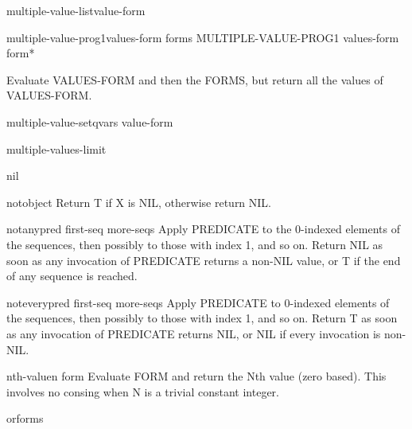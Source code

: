\begin{macro}{multiple-value-list}{value-form}{}
  
\end{macro}

\begin{specialop}{multiple-value-prog1}{values-form \rest forms}{}
  MULTIPLE-VALUE-PROG1 values-form form*

Evaluate VALUES-FORM and then the FORMS, but return all the values of
VALUES-FORM.
\end{specialop}

\begin{macro}{multiple-value-setq}{vars value-form}{}
  
\end{macro}

\begin{constant}{multiple-values-limit}{}{}
  
\end{constant}

\begin{constant}{nil}{}{}
  
\end{constant}

\begin{function}{not}{object}{}
  Return T if X is NIL, otherwise return NIL.
\end{function}

\begin{function}{notany}{pred first-seq \rest more-seqs}{}
  Apply PREDICATE to the 0-indexed elements of the sequences, then
   possibly to those with index 1, and so on. Return NIL as soon
   as any invocation of PREDICATE returns a non-NIL value, or T if the end
   of any sequence is reached.
\end{function}

\begin{function}{notevery}{pred first-seq \rest more-seqs}{}
  Apply PREDICATE to 0-indexed elements of the sequences, then
   possibly to those with index 1, and so on. Return T as soon
   as any invocation of PREDICATE returns NIL, or NIL if every invocation
   is non-NIL.
\end{function}

\begin{macro}{nth-value}{n form}{}
  Evaluate FORM and return the Nth value (zero based). This involves no
  consing when N is a trivial constant integer.
\end{macro}

\begin{macro}{or}{\rest forms}{}
  
\end{macro}

